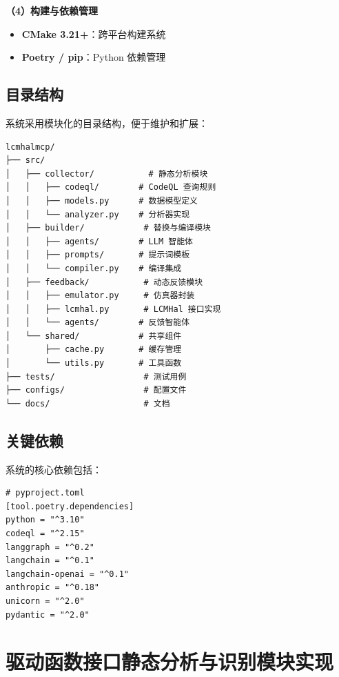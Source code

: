 \textbf{（4）构建与依赖管理}

\begin{itemize}
    \item \textbf{CMake 3.21+}：跨平台构建系统
    \item \textbf{Poetry / pip}：Python 依赖管理
\end{itemize}

\subsection{目录结构}

系统采用模块化的目录结构，便于维护和扩展：

\begin{lstlisting}[style=CStyle,abovecaptionskip=0pt,belowcaptionskip=0pt]
lcmhalmcp/
├── src/
│   ├── collector/           # 静态分析模块
│   │   ├── codeql/        # CodeQL 查询规则
│   │   ├── models.py      # 数据模型定义
│   │   └── analyzer.py    # 分析器实现
│   ├── builder/            # 替换与编译模块
│   │   ├── agents/        # LLM 智能体
│   │   ├── prompts/       # 提示词模板
│   │   └── compiler.py    # 编译集成
│   ├── feedback/           # 动态反馈模块
│   │   ├── emulator.py     # 仿真器封装
│   │   ├── lcmhal.py       # LCMHal 接口实现
│   │   └── agents/        # 反馈智能体
│   └── shared/            # 共享组件
│       ├── cache.py       # 缓存管理
│       └── utils.py       # 工具函数
├── tests/                  # 测试用例
├── configs/                # 配置文件
└── docs/                   # 文档
\end{lstlisting}

\subsection{关键依赖}

系统的核心依赖包括：

\begin{lstlisting}[style=CStyle,abovecaptionskip=0pt,belowcaptionskip=0pt]
# pyproject.toml
[tool.poetry.dependencies]
python = "^3.10"
codeql = "^2.15"
langgraph = "^0.2"
langchain = "^0.1"
langchain-openai = "^0.1"
anthropic = "^0.18"
unicorn = "^2.0"
pydantic = "^2.0"
\end{lstlisting}

\section{驱动函数接口静态分析与识别模块实现}
\label{sec:collector_impl}


